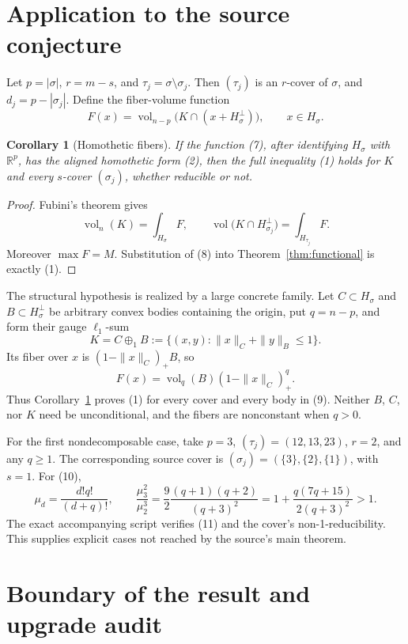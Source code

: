 \documentclass[11pt]{article}
\newtheorem{corollary}[theorem]{Corollary}
\newcommand{\R}{\mathbb R}
\newcommand{\vol}{\operatorname{vol}}
\begin{document}
\section{Application to the source conjecture}

Let \(p=|\sigma|\), \(r=m-s\), and
\(\tau_j=\sigma\setminus\sigma_j\).  Then \((\tau_j)\) is an \(r\)-cover
of \(\sigma\), and \(d_j=p-|\sigma_j|\).  Define the fiber-volume function
\[
 F(x)=\vol_{n-p}\bigl(K\cap(x+H_\sigma^\perp)\bigr),
 \qquad x\in H_\sigma. \tag{7}
\]

\begin{corollary}[Homothetic fibers]
\label{cor:geometric}
If the function (7), after identifying \(H_\sigma\) with \(\R^p\), has
the aligned homothetic form (2), then the full inequality (1) holds for
\(K\) and every \(s\)-cover \((\sigma_j)\), whether reducible or not.
\end{corollary}

\begin{proof}
Fubini's theorem gives
\[
 \vol_n(K)=\int_{H_\sigma}F,
 \qquad
 \vol\bigl(K\cap H_{\sigma_j}^\perp\bigr)
 =\int_{H_{\tau_j}}F. \tag{8}
\]
Moreover \(\max F=M\).  Substitution of (8) into
Theorem~\ref{thm:functional} is exactly (1).
\end{proof}

The structural hypothesis is realized by a large concrete family.  Let
\(C\subset H_\sigma\) and \(B\subset H_\sigma^\perp\) be arbitrary convex
bodies containing the origin, put \(q=n-p\), and form their gauge
\(\ell_1\)-sum
\[
 K=C\oplus_1B
 :=\{(x,y):\|x\|_C+\|y\|_B\le1\}. \tag{9}
\]
Its fiber over \(x\) is \((1-\|x\|_C)_+B\), so
\[
 F(x)=\vol_q(B)(1-\|x\|_C)_+^q. \tag{10}
\]
Thus Corollary~\ref{cor:geometric} proves (1) for every cover and every body
in (9).  Neither \(B\), \(C\), nor \(K\) need be unconditional, and the
fibers are nonconstant when \(q>0\).

For the first nondecomposable case, take \(p=3\),
\((\tau_j)=(12,13,23)\), \(r=2\), and any \(q\ge1\).  The corresponding
source cover is \((\sigma_j)=(\{3\},\{2\},\{1\})\), with \(s=1\).
For (10),
\[
 \mu_d=\frac{d!q!}{(d+q)!},\qquad
 \frac{\mu_3^2}{\mu_2^3}
 =\frac92\frac{(q+1)(q+2)}{(q+3)^2}
 =1+\frac{q(7q+15)}{2(q+3)^2}>1. \tag{11}
\]
The exact accompanying script verifies (11) and the cover's
non-1-reducibility.  This supplies explicit cases not reached by the source's
main theorem.

\section{Boundary of the result and upgrade audit}
\end{document}
